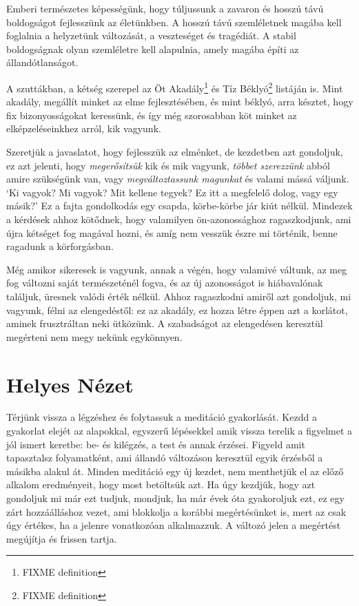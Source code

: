 Emberi természetes képességünk, hogy túljussunk a zavaron és hosszú távú
boldogságot fejlesszünk az életünkben. A hosszú távú szemléletnek magába
kell foglalnia a helyzetünk változását, a veszteséget és tragédiát. A
stabil boldogságnak olyan szemléletre kell alapulnia, amely magába építi
az állandótlanságot.

A szuttákban, a kétség szerepel az Öt Akadály\footnote{FIXME definition}
és Tíz Béklyó\footnote{FIXME definition} listáján is. Mint akadály,
megállít minket az elme fejlesztésében, és mint béklyó, arra késztet,
hogy fix bizonyosságokat keressünk, és így még szorosabban köt minket az
elképzeléseinkhez arról, kik vagyunk.

Szeretjük a javaslatot, hogy fejlesszük az elménket, de kezdetben azt
gondoljuk, ez azt jelenti, hogy \emph{megerősítsük} kik és mik vagyunk,
\emph{többet szerezzünk} abból amire szükségünk van, vagy
\emph{megváltoztassunk magunkat} és valami mássá váljunk. `Ki vagyok? Mi
vagyok? Mit kellene tegyek? Ez itt a megfelelő dolog, vagy egy másik?'
Ez a fajta gondolkodás egy csapda, körbe-körbe jár kiút nélkül. Mindezek
a kérdések ahhoz kötődnek, hogy valamilyen ön-azonossághoz
ragaszkodjunk, ami újra kétséget fog magával hozni, és amíg nem vesszük
észre mi történik, benne ragadunk a körforgásban.

Még amikor sikeresek is vagyunk, annak a végén, hogy valamivé váltunk,
az meg fog változni saját természeténél fogva, és az új azonosságot is
hiábavalónak találjuk, üresnek valódi érték nélkül. Ahhoz ragaszkodni
amiről azt gondoljuk, mi vagyunk, félni az elengedéstől: ez az akadály,
ez hozza létre éppen azt a korlátot, aminek frusztráltan neki ütközünk.
A szabadságot az elengedésen keresztül megérteni nem megy nekünk
egykönnyen.

\section{Helyes Nézet}

Térjünk vissza a légzéshez és folytassuk a meditáció gyakorlását. Kezdd
a gyakorlat elejét az alapokkal, egyszerű lépésekkel amik vissza terelik
a figyelmet a jól ismert keretbe: be- és kilégzés, a test és annak
érzései. Figyeld amit tapasztalsz folyamatként, ami állandó változáson
keresztül egyik érzésből a másikba alakul át. Minden meditáció egy új
kezdet, nem menthetjük el az előző alkalom eredményeit, hogy most
betöltsük azt. Ha úgy kezdjük, hogy azt gondoljuk mi már ezt tudjuk,
mondjuk, ha már évek óta gyakoroljuk ezt, ez egy zárt hozzáálláshoz
vezet, ami blokkolja a korábbi megértésünket is, mert az csak úgy
értékes, ha a jelenre vonatkozóan alkalmazzuk. A változó jelen a
megértést megújítja és frissen tartja.

